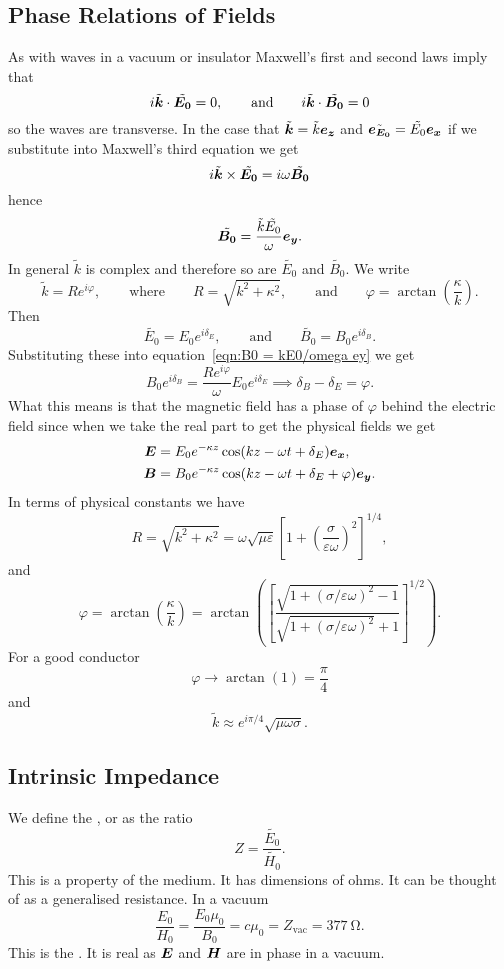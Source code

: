     \subsection{Phase Relations of Fields}
    As with waves in a vacuum or insulator Maxwell's first and second laws imply that
    \[i\tilde{\bm{k}}\cdot\tilde{\bm{E_0}} = 0, \qquad\text{and}\qquad i\tilde{\bm{k}}\cdot\tilde{\bm{B_0}} = 0\]
    so the waves are transverse.
    In the case that \(\tilde{\bm{k}} = \tilde{k}\bm{e_{z}}\) and \(\tilde{\bm{e_{E_0}}} = \tilde{E_0}\bm{e_{x}}\) if we substitute into Maxwell's third equation we get
    \[i\tilde{\bm{k}}\times\tilde{\bm{E_0}} = i\omega\tilde{\bm{B_0}}\]
    hence
    \begin{equation}\label{eqn:B0 = kE0/omega ey}
        \tilde{\bm{B_0}} = \frac{\tilde{k}\tilde{E_0}}{\omega}\bm{e_{y}}.
    \end{equation}
    In general \(\tilde{k}\) is complex and therefore so are \(\tilde{E_0}\) and \(\tilde{B_0}\).
    We write
    \[\tilde{k} = Re^{i\varphi}, \qquad\text{where}\qquad R = \sqrt{k^2 + \kappa^2}, \qquad\text{and}\qquad \varphi = \arctan\left(\frac{\kappa}{k}\right).\]
    Then
    \[\tilde{E_0} = E_0e^{i\delta_E}, \qquad\text{and}\qquad \tilde{B_0} = B_0e^{i\delta_B}.\]
    Substituting these into equation~\ref{eqn:B0 = kE0/omega ey} we get
    \[B_0e^{i\delta_B} = \frac{Re^{i\varphi}}{\omega}E_0e^{i\delta_E} \implies \delta_B - \delta_E = \varphi.\]
    What this means is that the magnetic field has a phase of \(\varphi\) behind the electric field since when we take the real part to get the physical fields we get
    \begin{align*}
        \bm{E} &= E_0e^{-\kappa z}\cos(kz - \omega t + \delta_E)\bm{e_{x}},\\
        \bm{B} &= B_0e^{-\kappa z}\cos(kz - \omega t + \delta_E + \varphi)\bm{e_{y}}.
    \end{align*}
    In terms of physical constants we have
    \[R = \sqrt{k^2 + \kappa^2} = \omega\sqrt{\mu\varepsilon}\left[1 + \left(\frac{\sigma}{\varepsilon\omega}\right)^2\right]^{1/4},\]
    and
    \[\varphi = \arctan\left(\frac{\kappa}{k}\right)  = \arctan\left(\left[\frac{\sqrt{1 + (\sigma/\varepsilon\omega)^2 - 1}}{\sqrt{1 + (\sigma/\varepsilon\omega)^2} + 1}\right]^{1/2}\right).\]
    For a good conductor
    \[\varphi \to \arctan(1) = \frac{\pi}{4}\]
    and
    \[\tilde{k} \approx e^{i\pi/4}\sqrt{\mu\omega\sigma}.\]
    
    \subsection{Intrinsic Impedance}
    We define the , or  as the ratio
    \[Z = \frac{\tilde{E_0}}{\tilde{H_0}}.\]
    This is a property of the medium.
    It has dimensions of ohms.
    It can be thought of as a generalised resistance.
    In a vacuum
    \[\frac{E_0}{H_0} = \frac{E_0\mu_0}{B_0} = c\mu_0 = Z_{\text{vac}} = \SI{377}{\ohm}.\]
    This is the .
    It is real as \(\bm{E}\) and \(\bm{H}\) are in phase in a vacuum.
    

